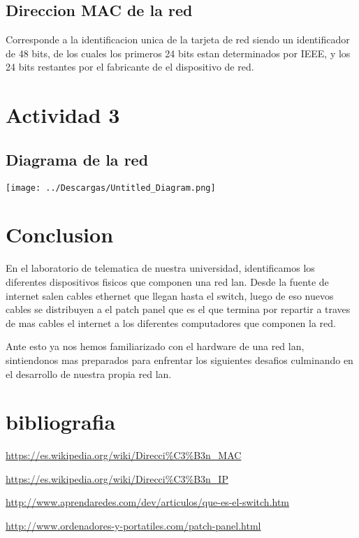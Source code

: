 \documentclass[11pt,a4paper]{report}
\begin{document}
\begin{multicols}{2}
\subsection{Direccion MAC de la red}
Corresponde a la identificacion unica de la tarjeta de red siendo un identificador de 48 bits, de los cuales los primeros 24 bits estan determinados por IEEE,  y los 24 bits restantes por el fabricante de el dispositivo de red.

\section{Actividad 3}
\subsection{Diagrama de la red}
\texttt{[image: ../Descargas/Untitled\_Diagram.png]} 
\section{Conclusion}
En el laboratorio de telematica de nuestra universidad, identificamos los diferentes dispositivos fisicos que componen una red lan. Desde la fuente de internet salen cables ethernet que llegan hasta el switch, luego de eso nuevos cables se distribuyen a el patch panel que es el que termina por repartir a traves de mas cables el internet a los diferentes computadores que componen la red.

Ante esto ya nos hemos familiarizado con el hardware de una red lan, sintiendonos mas preparados para enfrentar los siguientes desafios culminando en el desarrollo de nuestra propia red lan.


\end{multicols}
\section{bibliografia}

\url{https://es.wikipedia.org/wiki/Direcci%C3%B3n_MAC}

\url{https://es.wikipedia.org/wiki/Direcci%C3%B3n_IP}

\url{http://www.aprendaredes.com/dev/articulos/que-es-el-switch.htm}

\url{http://www.ordenadores-y-portatiles.com/patch-panel.html}





 
\end{document}
